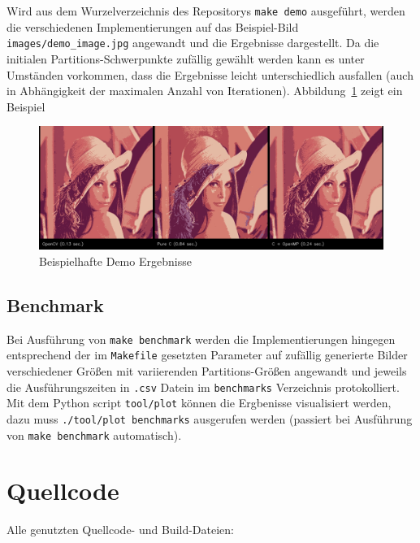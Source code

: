 \documentclass[
    bibliography=totoc, cd=lightcolor, cdmath=false, ngerman]{tudscrreprt}
\begin{document}
Wird aus dem Wurzelverzeichnis des Repositorys \texttt{make demo} ausgeführt,
werden die verschiedenen Implementierungen auf das Beispiel-Bild
\texttt{images/demo\_image.jpg} angewandt und die Ergebnisse dargestellt. Da
die initialen Partitions-Schwerpunkte zufällig gewählt werden kann es unter
Umständen vorkommen, dass die Ergebnisse leicht unterschiedlich ausfallen
(auch in Abhängigkeit der maximalen Anzahl von Iterationen).
Abbildung~\ref{img:demoresults} zeigt ein Beispiel

\begin{figure}[h]
\centering
\includegraphics[width=\textwidth]{report/resources/demo_results.jpg}
\caption{Beispielhafte Demo Ergebnisse}
\label{img:demoresults}
\end{figure}

\section{Benchmark}

Bei Ausführung von \texttt{make benchmark} werden die Implementierungen
hingegen entsprechend der im \texttt{Makefile} gesetzten Parameter auf zufällig
generierte Bilder verschiedener Größen mit variierenden Partitions-Größen
angewandt und jeweils die Ausführungszeiten in \texttt{.csv} Datein im
\texttt{benchmarks} Verzeichnis protokolliert. Mit dem Python script
\texttt{tool/plot} können die Ergbenisse visualisiert werden, dazu muss
\texttt{./tool/plot benchmarks} ausgerufen werden (passiert bei Ausführung von
\texttt{make benchmark} automatisch).

\chapter{Quellcode}

Alle genutzten Quellcode- und Build-Dateien:

\inputminted{C}{c/include/kmeans.h}

\inputminted{C}{config/kmeans_config.h}
\end{document}
